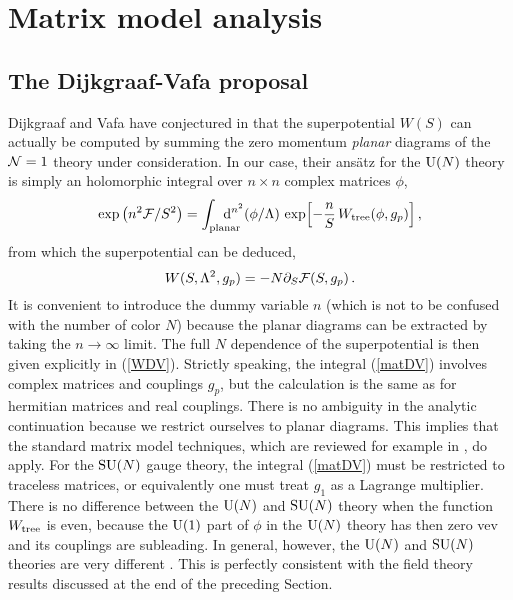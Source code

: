 \documentclass[a4paper,12pt]{article}
\def\d{{\rm d}}
\def\suN{{\rm SU}(N)}
\def\uN{{\rm U}(N)}
\def\wt{W_{\rm tree}}\def\weff{W_{\rm eff}}\def\ww{{\cal W}}
\begin{document}
%
\section{Matrix model analysis}
%

%
\subsection{The Dijkgraaf-Vafa proposal}
%

Dijkgraaf and Vafa have conjectured in \cite{DV}
that the superpotential $W(S)$
can actually be computed by summing the zero momentum
{\it planar} diagrams of the ${\cal N}=1$ theory under consideration. 
In our case, their ans\"atz for the $\uN$ theory
is simply an holomorphic integral over $n\times n$ complex matrices $\phi$,
%
\begin{equation}
\label{matDV}
\exp\left( n^{2}\F /S^{2}\right) = \int_{\rm planar}
\hskip -.5cm\d^{n^{2}}(\phi/\L)\,
\exp\Bigl[ -{n\over S}\,\wt (\phi,g_{p})\Bigr]\, ,
\end{equation}
%
from which the superpotential can be deduced,
%
\begin{equation}
\label{WDV}
W(S,\Lambda^{2},g_{p}) = -N\partial_{S}{\cal F} (S,g_{p})\, .
\end{equation}
%
It is convenient to introduce the dummy variable $n$ (which
is not to be confused with the number of color $N$) because the planar 
diagrams can be extracted by taking the $n\rightarrow\infty$ limit. 
The full $N$ dependence of the superpotential is then given explicitly 
in (\ref{WDV}). Strictly speaking, the integral (\ref{matDV}) involves
complex matrices and couplings $g_{p}$, but the calculation is the same as
for hermitian matrices and real couplings. There is no ambiguity in the 
analytic continuation because we restrict ourselves to
planar diagrams. This implies that the standard matrix model 
techniques, which are reviewed for example in \cite{matrev}, do apply.
For the $\suN$ gauge theory, the integral (\ref{matDV})
must be restricted to traceless matrices, or equivalently one must
treat $g_{1}$ as a Lagrange multiplier. There is no difference between 
the $\uN$ and $\suN$ theory when the function $\wt$ is even, because 
the ${\rm U}(1)$ part of $\phi$ in the $\uN$ theory has then zero vev and 
its couplings are subleading. In general, however, the
$\uN$ and $\suN$ theories are very different \cite{fer}. This is perfectly 
consistent with the field theory results discussed at the end of the 
preceding Section.
\end{document}
